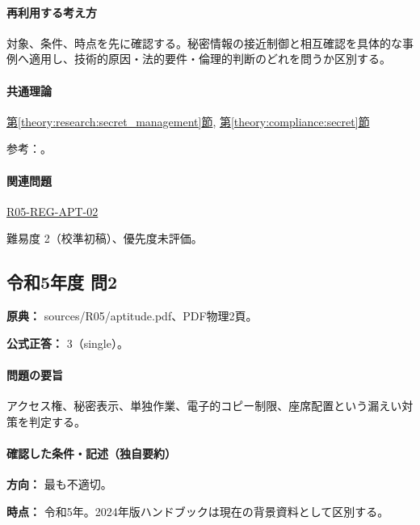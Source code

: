 \paragraph{再利用する考え方} 対象、条件、時点を先に確認する。秘密情報の接近制御と相互確認を具体的な事例へ適用し、技術的原因・法的要件・倫理的判断のどれを問うか区別する。

\paragraph{共通理論} \hyperref[theory:research:secret_management]{第\ref*{theory:research:secret_management}節}, \hyperref[theory:compliance:secret]{第\ref*{theory:compliance:secret}節}

\par 参考：\cite{meti_secret_handbook2024}。

\paragraph{関連問題} \hyperref[q:r05-reg-apt-02]{R05-REG-APT-02}

\par 難易度 2（校準初稿）、優先度未評価。

\subsection{令和5年度 問2}
\label{q:r05-reg-apt-02}

\noindent\textbf{原典：} sources/R05/aptitude.pdf、PDF物理2頁。

\textbf{公式正答：} 3（single）。

\paragraph{問題の要旨} アクセス権、秘密表示、単独作業、電子的コピー制限、座席配置という漏えい対策を判定する。

\paragraph{確認した条件・記述（独自要約）}\mbox{}\par

\noindent\textbf{方向：} 最も不適切。\par

\noindent\textbf{時点：} 令和5年。2024年版ハンドブックは現在の背景資料として区別する。\par

